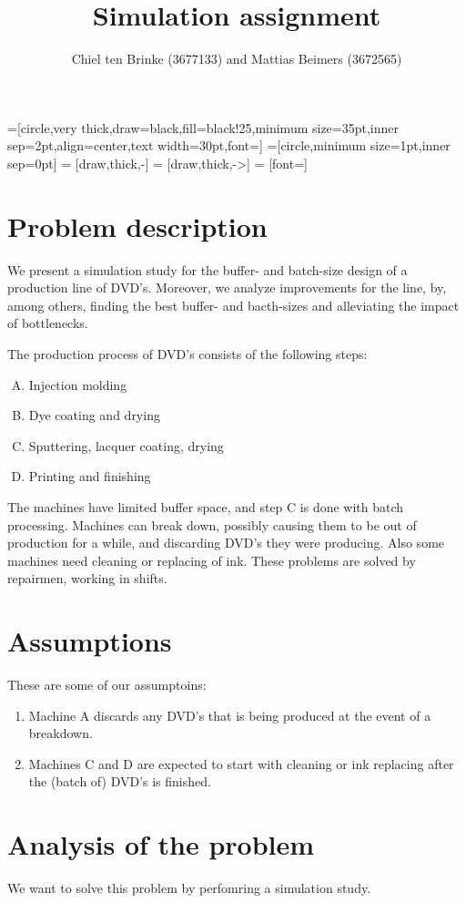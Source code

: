 \documentclass{article}
\title{Simulation assignment}
\author{Chiel ten Brinke (3677133) and Mattias Beimers (3672565)}
\date{\vspace{-3ex}}
\begin{document}
=[circle,very thick,draw=black,fill=black!25,minimum size=35pt,inner sep=2pt,align=center,text width=30pt,font=\tiny]
=[circle,minimum size=1pt,inner sep=0pt]
 = [draw,thick,-]
 = [draw,thick,->]
 = [font=\small]

\maketitle


\section{Problem description}
We present a simulation study for the buffer- and batch-size design of a production line of DVD's.
Moreover, we analyze improvements for the line, by, among others, finding the best buffer- and bacth-sizes and alleviating the impact of bottlenecks.

The production process of DVD's consists of the following steps:
\begin{enumerate}[A.]
    \item Injection molding
    \item Dye coating and drying
    \item Sputtering, lacquer coating, drying
    \item Printing and finishing 
\end{enumerate}
The machines have limited buffer space, and step C is done with batch processing.
Machines can break down, possibly causing them to be out of production for a while,
and discarding DVD's they were producing. Also some machines need cleaning or replacing of ink.
These problems are solved by repairmen, working in shifts.

\section{Assumptions}
These are some of our assumptoins:
\begin{enumerate}
    \item 
        Machine A discards any DVD's that is being produced at the event of a breakdown.
    \item 
        Machines C and D are expected to start with cleaning or ink replacing after the (batch of) DVD's is finished.
\end{enumerate}

\section{Analysis of the problem}
We want to solve this problem by perfomring a simulation study. %
\end{document}
